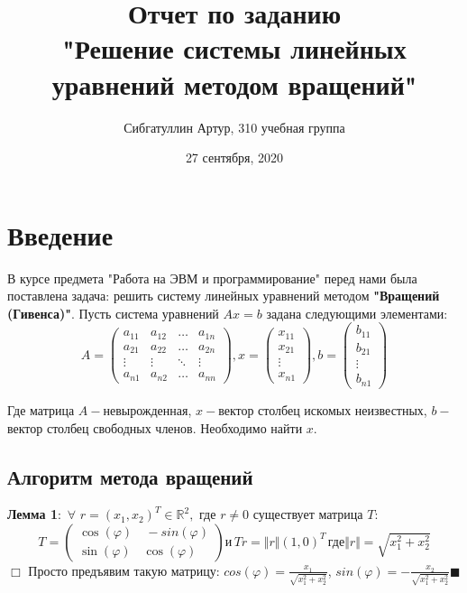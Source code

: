 \documentclass[a4paper, fontsize=14pt]{article}
\title{\textbf{Отчет по заданию \\"Решение системы линейных уравнений методом вращений"}}
\author{Сибгатуллин Артур, 310 учебная группа}
\date{27 сентября, 2020}
\begin{document}
        \maketitle

    \newpage
        \tableofcontents

        \newpage
	\section{Введение}
		 В курсе предмета "Работа на ЭВМ и программирование" перед нами была поставлена задача: решить систему линейных уравнений методом \textbf{"Вращений (Гивенса)"}.
		 Пусть система уравнений $Ax = b $ задана следующими элементами:
		 \begin{equation*}
			 	A = \left(
			 	\begin{array}{cccc}
			 		a_{11} & a_{12} & \ldots & a_{1n}\\
			 		a_{21} & a_{22} & \ldots & a_{2n}\\
			 		\vdots & \vdots & \ddots & \vdots\\
			 		a_{n1} & a_{n2} & \ldots & a_{nn}
			 	\end{array}
			 	\right), 
			 	x = \left(
			 	\begin{array}{cccc}
			 		x_{11} \\
			 		x_{21} \\
			 		\vdots \\
			 		x_{n1} 
			 	\end{array}
			 	\right),	
			 	b = \left(
			 	\begin{array}{cccc}
			 		b_{11} \\
			 		b_{21} \\
			 		\vdots \\
			 		b_{n1} 
			 	\end{array}
			 	\right)
	 	\end{equation*}
 	
 	
		Где матрица $A-$невырожденная, $x-$вектор столбец искомых неизвестных, $b-$вектор столбец свободных членов. Необходимо найти $x$.
		
		\subsection{Алгоритм метода вращений}
		
		\textbf{Лемма 1}: $ \, \forall \, \, r = (x_1,x_2)^T \in \mathbb{R}^2,$ где $r\neq0$ существует матрица $T$:
		 $$T = \begin{pmatrix}
			\cos(\varphi)& \ -sin(\varphi)\\
			\sin(\varphi)& \cos(\varphi)
		\end{pmatrix} \text{и} \, Tr = \Vert r \Vert(1,0)^T \, \text{где} \Vert r \Vert = \sqrt{x_1^2 + x_2^2} $$
		$\Box$
		Просто предъявим такую матрицу: $cos(\varphi) = \frac{x_1}{\sqrt{x_1^2 + x_2^2}}$, $sin(\varphi) = -\frac{x_2}{\sqrt{x_1^2 + x_2^2}}\blacksquare$
		
\end{document}
